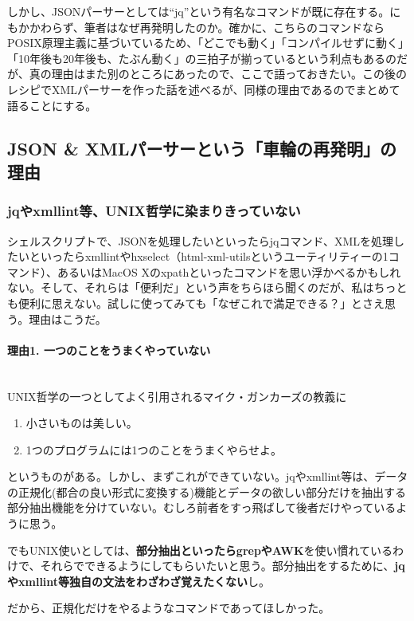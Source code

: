 しかし、JSONパーサーとしては``jq''という有名なコマンドが既に存在する。にもかかわらず、筆者はなぜ再発明したのか。確かに、こちらのコマンドならPOSIX原理主義に基づいているため、「どこでも動く」「コンパイルせずに動く」「10年後も20年後も、たぶん動く」の三拍子が揃っているという利点もあるのだが、真の理由はまた別のところにあったので、ここで語っておきたい。この後のレシピでXMLパーサーを作った話を述べるが、同様の理由であるのでまとめて語ることにする。

\subsection*{JSON \& XMLパーサーという「車輪の再発明」の理由}

\subsubsection*{jqやxmllint等、UNIX哲学に染まりきっていない}

シェルスクリプトで、JSONを処理したいといったらjqコマンド、XMLを処理したいといったらxmllintやhxselect（html-xml-utilsというユーティリティーの1コマンド）、あるいはMacOS Xのxpathといったコマンドを思い浮かべるかもしれない。そして、それらは「便利だ」という声をちらほら聞くのだが、私はちっとも便利に思えない。試しに使ってみても「なぜこれで満足できる？」とさえ思う。理由はこうだ。

\paragraph{理由1. 一つのことをうまくやっていない}　\\
UNIX哲学の一つとしてよく引用されるマイク・ガンカーズの教義に
\begin{enumerate}
\setcounter{enumi}{0}
  \item 小さいものは美しい。
  \item 1つのプログラムには1つのことをうまくやらせよ。
\end{enumerate}
というものがある。しかし、まずこれができていない。jqやxmllint等は、データの正規化(都合の良い形式に変換する)機能とデータの欲しい部分だけを抽出する部分抽出機能を分けていない。むしろ前者をすっ飛ばして後者だけやっているように思う。

でもUNIX使いとしては、\textbf{部分抽出といったらgrepやAWK}を使い慣れているわけで、それらでできるようにしてもらいたいと思う。部分抽出をするために、\textbf{jqやxmllint等独自の文法をわざわざ覚えたくない}し。

だから、正規化だけをやるようなコマンドであってほしかった。

